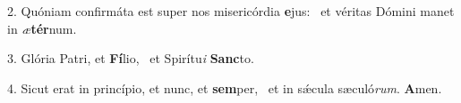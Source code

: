 2. Quóniam confirmáta est super nos misericórdia \textbf{e}jus: \ast\  et véritas Dómini manet in \textit{æ}\textbf{tér}num.\

3. Glória Patri, et \textbf{Fí}lio, \ast\  et Spirítu\textit{i} \textbf{Sanc}to.\

4. Sicut erat in princípio, et nunc, et \textbf{sem}per, \ast\  et in sǽcula sæculó\textit{rum}. \textbf{A}men.\

